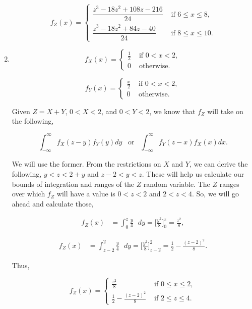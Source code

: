\documentclass[12pt]{article}
\begin{document}
\begin{enumerate}[label=(\alph*)]
\[ f_Z(x) = \begin{cases} 
      \dfrac{z^3-18z^2+108z-216}{24} & \text{ if } 6 \leq x \leq 8, \\
      \dfrac{z^3-18z^2+84z-40}{24} & \text{ if } 8 \leq x \leq 10.
      \end{cases} \]

\item 
\[ f_X(x) = \begin{cases} 
      \frac{1}{2} & \text{ if } 0 < x < 2, \\
      0 & \text{ otherwise}.
      \end{cases} \]
      
 \[ f_Y(x) = \begin{cases} 
      \frac{x}{2} & \text{ if } 0 < x < 2, \\
      0 & \text{ otherwise}.
      \end{cases} \]
      
\noindent
Given $Z = X + Y$, $0 < X < 2$, and $0 < Y < 2$, we know that $f_Z$ will take on the following,

\begin{equation*}
\int_{- \infty}^{\infty} f_X(z-y) f_Y(y) dy \enspace \text{ or } \enspace \int_{- \infty}^{\infty} f_Y(z-x) f_X(x) dx.
\end{equation*}

\noindent
We will use the former. From the restrictions on $X$ and $Y$, we can derive the following, $y < z < 2+y$ and $z-2 < y < z$. These will help us calculate our bounds of integration and ranges of the $Z$ random variable. The $Z$ ranges over which $f_Z$ will have a value is $0 < z < 2$ and $2 < z < 4$. So, we will go ahead and calculate those,

\begin{align*}
f_Z(x) &= \int_{0}^{z} \frac{y}{4} \text{ } dy = \Bigg [ \frac{y^2}{8} \Bigg ]_{0}^{z} = \frac{z^2}{8},
\end{align*}

\begin{align*}
f_Z(x) &= \int_{z-2}^{2} \frac{y}{4} \text{ } dy = \Bigg [ \frac{y^2}{8} \Bigg ]_{z-2}^{2} = \frac{1}{2} - \frac{(z-2)^2}{8}.
\end{align*}

\noindent
Thus, 

\[ f_Z(x) = \begin{cases} 
      \frac{z^2}{8} & \text{ if } 0 \leq x \leq 2, \\
      \frac{1}{2} - \frac{(z-2)^2}{8} & \text{ if } 2 \leq z \leq 4.
      \end{cases} \]

\end{enumerate}
\end{document}
